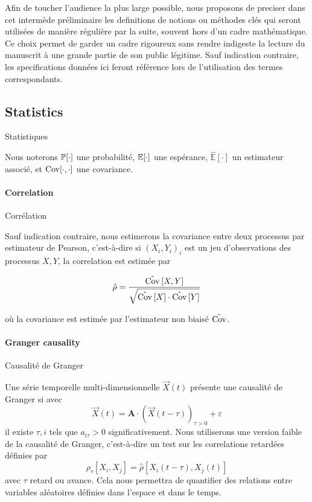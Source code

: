 \label{ch:preliminarymath}



Afin de toucher l'audience la plus large possible, nous proposons de preciser dans cet intermède préliminaire les definitions de notions ou méthodes clés qui seront utilisées de manière régulière par la suite, souvent hors d'un cadre mathématique. Ce choix permet de garder un cadre rigoureux sans rendre indigeste la lecture du manuscrit à une grande partie de son public légitime. Sauf indication contraire, les specifications données ici feront référence lors de l'utilisation des termes correspondants.



\subsection*{Statistics}{Statistiques}


Nous noterons $\operatorname{\mathbb{P}}\!\left[\cdot\right]$ une probabilité, $\operatorname{\mathbb{E}}\!\left[\cdot\right]$ une espérance, $\hat{\mathbb{E}}\left[\cdot\right]$ un estimateur associé, et $\operatorname{Cov}\!\left[\cdot,\cdot\right]$ une covariance.

\paragraph*{Correlation}{Corrélation}

Sauf indication contraire, nous estimerons la covariance entre deux processus par estimateur de Pearson, c'est-à-dire si $(X_i,Y_i)_i$ est un jeu d'observations des processus $X,Y$, la correlation est estimée par

\[
\hat{\rho} = \frac{\hat{\operatorname{Cov}}\left[X,Y\right]}{\sqrt{\hat{\operatorname{Cov}} \left[X\right] \cdot \hat{\operatorname{Cov}}\left[Y\right]}}
\]

où la covariance est estimée par l'estimateur non biaisé $\hat{\operatorname{Cov}}$.




\paragraph*{Granger causality}{Causalité de Granger}


Une série temporelle multi-dimensionnelle $\vec{X}(t)$ présente une causalité de Granger si avec
\[
\vec{X}(t) = \mathbf{A}\cdot \left(\vec{X}(t-\tau)\right)_{\tau >0} + \varepsilon
\]
il existe $\tau,i$ tels que $a_{i\tau}>0$ significativement. Nous utiliserons une version faible de la causalité de Granger, c'est-à-dire un test sur les correlations retardées définies par
\[
\rho_{\tau}\left[X_i,X_j\right] = \hat{\rho}\left[X_i(t-\tau),X_j(t)\right]
\]
avec $\tau$ retard ou avance. Cela nous permettra de quantifier des relations entre variables aléatoires définies dans l'espace et dans le temps.



